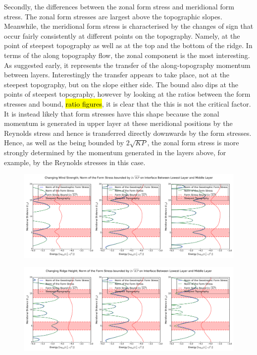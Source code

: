 \documentclass[12pt,a4paper]{report}
\begin{document}
Secondly, the differences between the zonal form stress and meridional form stress. 
The zonal form stresses are largest above the topographic slopes. Meanwhile, the meridional
form stress is characterised by the changes of sign that occur fairly consistently at
different points on the topography. Namely, at the point of steepest topography as
well as at the top and the bottom of the ridge. In terms of the along topography
flow, the zonal component is the most interesting. As suggested early, it represents
the transfer of the along-topography momentum between layers. Interestingly the
transfer appears to take place, not at the steepest topography, but on the slope either
side. The bound also dips at the points of steepest topography, however by looking
at the ratios between the form stresses and bound, \hl{ratio figures}, it is clear
that the this is not the critical factor. It is instead likely that form stresses have this
 shape because the zonal momentum is generated in upper layer at these meridional 
 positions by the Reynolds stress and hence is transferred directly downwards by the form
  stresses. Hence, as well as the being bounded by $2 \sqrt{KP}$, the zonal form stress
  is more strongly determined by the momentum generated in the layers above, for example,
  by the Reynolds stresses in this case.

\begin{figure}
	\centering
	\includegraphics[width=\linewidth]{uepebound_0_0}
	\caption{ }
\end{figure}

\begin{figure}
	\centering
	\includegraphics[width=\linewidth]{uepebound_1_0}
	\caption{ }
\end{figure}
\end{document}
